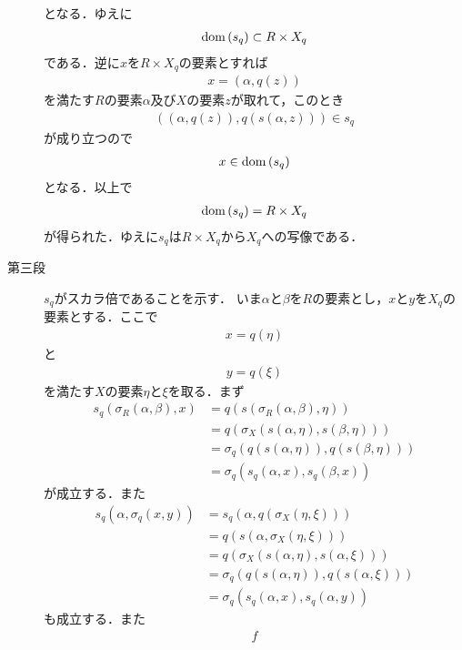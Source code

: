 \begin{sketch}
\begin{description}
				となる．ゆえに
				\begin{align}
					\operatorname*{dom} \left(s_q\right) \subset R \times X_q
				\end{align}
				である．逆に$x$を$R \times X_q$の要素とすれば
				\begin{align}
					x = \left(\alpha,q(z)\right)
				\end{align}
				を満たす$R$の要素$\alpha$及び$X$の要素$z$が取れて，このとき
				\begin{align}
					\left(\left(\alpha,q(z)\right),q\left(s(\alpha,z)\right)\right) \in s_q
				\end{align}
				が成り立つので
				\begin{align}
					x \in \operatorname*{dom} \left(s_q\right)
				\end{align}
				となる．以上で
				\begin{align}
					\operatorname*{dom} \left(s_q\right) = R \times X_q
				\end{align}
				が得られた．ゆえに$s_q$は$R \times X_q$から$X_q$への写像である．
				
			\item[第三段] $s_q$がスカラ倍であることを示す．
				いま$\alpha$と$\beta$を$R$の要素とし，$x$と$y$を$X_q$の要素とする．ここで
				\begin{align}
					x = q(\eta)
				\end{align}
				と
				\begin{align}
					y = q(\xi)
				\end{align}
				を満たす$X$の要素$\eta$と$\xi$を取る．まず
				\begin{align}
					s_q\left(\sigma_R(\alpha,\beta),x\right)
					&= q\left(s\left(\sigma_R(\alpha,\beta),\eta\right)\right) \\
					&= q\left(\sigma_X\left(s(\alpha,\eta),s(\beta,\eta)\right)\right) \\
					&= \sigma_q\left(q\left(s(\alpha,\eta)\right),q\left(s(\beta,\eta)\right)\right) \\
					&= \sigma_q\left(s_q(\alpha,x),s_q(\beta,x)\right)
				\end{align}
				が成立する．また
				\begin{align}
					s_q\left(\alpha,\sigma_q(x,y)\right)
					&= s_q\left(\alpha,q\left(\sigma_X(\eta,\xi)\right)\right) \\
					&= q\left(s\left(\alpha,\sigma_X(\eta,\xi)\right)\right) \\
					&= q\left(\sigma_X(s(\alpha,\eta),s(\alpha,\xi))\right) \\
					&= \sigma_q\left(q\left(s(\alpha,\eta)\right),q\left(s(\alpha,\xi)\right)\right) \\
					&= \sigma_q\left(s_q(\alpha,x),s_q(\alpha,y)\right)
				\end{align}
				も成立する．また
				\begin{align}
					f
				\end{align}
		\end{description}
	\end{sketch}